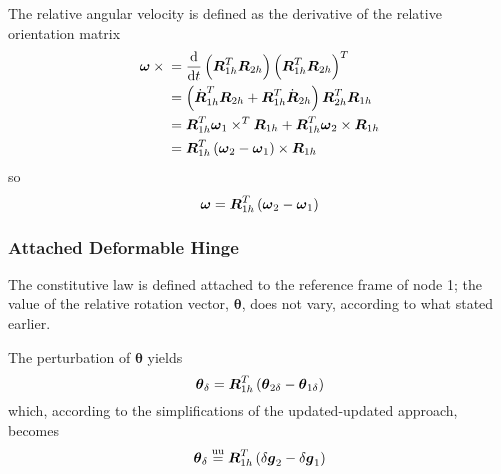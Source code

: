 \documentclass[10pt,dvips,fleqn]{report}
\newcommand{\T}[1]{\boldsymbol{#1}}
\newcommand{\equu}{\overset{\mathrm{uu}}{=}}
\begin{document}
The relative angular velocity is defined as the derivative
of the relative orientation matrix
\begin{align}
	\T{\omega}\times{}
	&= \frac{\mathrm{d}}{\mathrm{d}t} \plbr{
		\T{R}_{1h}^T \T{R}_{2h}
	} \plbr{
		\T{R}_{1h}^T \T{R}_{2h}
	}^T \\
	&= \plbr{
		\dot{\T{R}}_{1h}^T \T{R}_{2h}
		+ \T{R}_{1h}^T \dot{\T{R}}_{2h}
	} \T{R}_{2h}^T \T{R}_{1h} \\
	&= \T{R}_{1h}^T \T{\omega}_1 \times^T \T{R}_{1h}
	+ \T{R}_{1h}^T \T{\omega}_2 \times \T{R}_{1h} \\
	&= \T{R}_{1h}^T \plbr{
		\T{\omega}_2 - \T{\omega}_1
	}\times \T{R}_{1h}
\end{align}
so
\begin{equation}
	\T{\omega} = \T{R}_{1h}^T \plbr{
		\T{\omega}_2 - \T{\omega}_1
	}
	\label{eq:deformable-hinge-attached-omega}
\end{equation}



\subsubsection{Attached Deformable Hinge}
The constitutive law is defined attached to the reference frame of node 1;
the value of the relative rotation vector, $\T{\theta}$, does not vary,
according to what stated earlier.

The perturbation of $\T{\theta}$ yields
\begin{equation}
	\T{\theta}_{\delta} = \T{R}_{1h}^T\plbr{\T{\theta}_{2\delta} - \T{\theta}_{1\delta}}
	\label{eq:def-h-theta-delta}
\end{equation}
which, according to the simplifications of the updated-updated approach, becomes
\begin{equation}
	\T{\theta}_{\delta} \equu \T{R}_{1h}^T\plbr{\delta\T{g}_2 - \delta\T{g}_1}
\end{equation}
\end{document}

